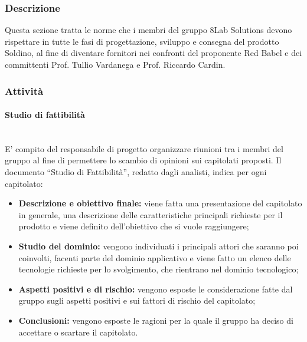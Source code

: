 \subsubsection{Descrizione}
Questa sezione tratta le norme che i membri del gruppo 8Lab Solutions devono rispettare in tutte le fasi di progettazione, sviluppo e consegna del prodotto Soldino, al fine di diventare fornitori nei confronti del proponente Red Babel e dei committenti Prof. Tullio Vardanega e Prof. Riccardo Cardin.
\subsubsection{Attività}
\paragraph{Studio di fattibilità} \mbox{}\\ 
E' compito del responsabile di progetto organizzare riunioni tra i membri del gruppo al fine di permettere lo scambio di opinioni sui capitolati proposti.
Il documento ``Studio di Fattibilità'', redatto dagli analisti, indica per ogni capitolato:
\begin{itemize}
	\item \textbf{Descrizione e obiettivo finale:} viene fatta una presentazione del capitolato in generale, una descrizione delle caratteristiche principali richieste per il prodotto e viene definito dell'obiettivo che si vuole raggiungere;
	\item \textbf{Studio del dominio:} vengono individuati i principali attori che saranno poi coinvolti, facenti parte del dominio applicativo e viene fatto un elenco delle tecnologie richieste per lo svolgimento, che rientrano nel dominio tecnologico;
	\item \textbf{Aspetti positivi e di rischio:} vengono esposte le considerazione fatte dal gruppo sugli aspetti positivi e sui fattori di rischio del capitolato;
	\item \textbf{Conclusioni:} vengono esposte le ragioni per la quale il gruppo ha deciso di accettare o scartare il capitolato.
\end{itemize}
